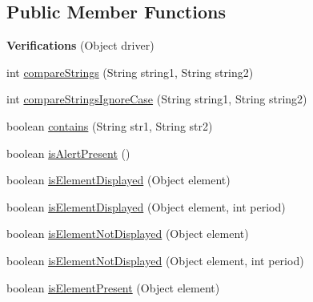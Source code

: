 \subsection*{Public Member Functions}
\begin{DoxyCompactItemize}
\item 
\hypertarget{classcom_1_1zeuslearning_1_1automation_1_1selenium_1_1interactions_1_1Verifications_af5442be45d7b6cada6f678fe7448efbc}{}\label{classcom_1_1zeuslearning_1_1automation_1_1selenium_1_1interactions_1_1Verifications_af5442be45d7b6cada6f678fe7448efbc} 
{\bfseries Verifications} (Object driver)
\item 
int \hyperlink{classcom_1_1zeuslearning_1_1automation_1_1selenium_1_1interactions_1_1Verifications_a6b6a456d89f7b442a2e2acdcce2a62fa}{compare\+Strings} (String string1, String string2)
\item 
int \hyperlink{classcom_1_1zeuslearning_1_1automation_1_1selenium_1_1interactions_1_1Verifications_a23860edcf479a39582e0e0199bdac9c5}{compare\+Strings\+Ignore\+Case} (String string1, String string2)
\item 
boolean \hyperlink{classcom_1_1zeuslearning_1_1automation_1_1selenium_1_1interactions_1_1Verifications_a5e29c5310810934f0e069203e35e31bc}{contains} (String str1, String str2)
\item 
boolean \hyperlink{classcom_1_1zeuslearning_1_1automation_1_1selenium_1_1interactions_1_1Verifications_a1719b6ad2358f7e080119d4cfa911ad8}{is\+Alert\+Present} ()
\item 
boolean \hyperlink{classcom_1_1zeuslearning_1_1automation_1_1selenium_1_1interactions_1_1Verifications_a848b9875c187f2c7f5bbf6b78f7db58f}{is\+Element\+Displayed} (Object element)
\item 
boolean \hyperlink{classcom_1_1zeuslearning_1_1automation_1_1selenium_1_1interactions_1_1Verifications_a264caf7f6bbeaec8a7a416024ec4617b}{is\+Element\+Displayed} (Object element, int period)
\item 
boolean \hyperlink{classcom_1_1zeuslearning_1_1automation_1_1selenium_1_1interactions_1_1Verifications_ab6c1a1245269d660bdcd26eff9ac35ad}{is\+Element\+Not\+Displayed} (Object element)
\item 
boolean \hyperlink{classcom_1_1zeuslearning_1_1automation_1_1selenium_1_1interactions_1_1Verifications_a5b51bdfb17dbfd284572253189f54fb4}{is\+Element\+Not\+Displayed} (Object element, int period)
\item 
boolean \hyperlink{classcom_1_1zeuslearning_1_1automation_1_1selenium_1_1interactions_1_1Verifications_a0624db14fc06201e55890b160331bde9}{is\+Element\+Present} (Object element)

\end{DoxyCompactItemize}

